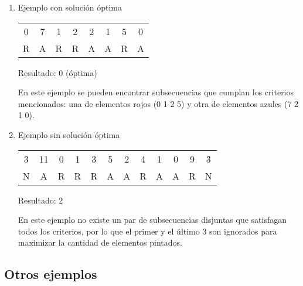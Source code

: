 	\begin{enumerate}
		\item Ejemplo con solución óptima

		\begin{tabular}{ c c c c c c c c }
			0 & 7 & 1 & 2 & 2 & 1 & 5 & 0 \\
			R & A & R & R & A & A & R & A \\
		\end{tabular}

		Resultado: 0 (óptima)

		En este ejemplo se pueden encontrar subsecuencias que cumplan los criterios mencionados: una de elementos rojos (0 1 2 5) y otra de elementos azules (7 2 1 0).

		\item Ejemplo sin solución óptima

		\begin{tabular}{ c c c c c c c c c c c c }
			3 & 11 & 0 & 1 & 3 & 5 & 2 & 4 & 1 & 0 & 9 & 3 \\
			N & A & R & R & R & A & A & R & A & A & R & N \\
		\end{tabular}

		Resultado: 2

		En este ejemplo no existe un par de subsecuencias disjuntas que satisfagan todos los criterios, por lo que el primer y el último 3 son ignorados para maximizar la cantidad de elementos pintados.
	\end{enumerate}

	\subsection{Otros ejemplos}

